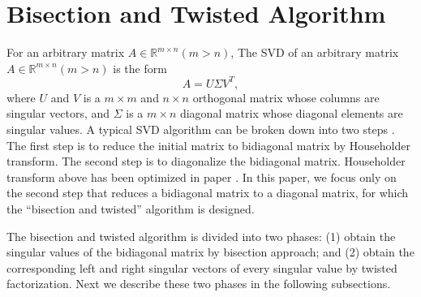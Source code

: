 \section{Bisection and Twisted Algorithm} \label{sec:algorithm}
For an arbitrary matrix $A\in \mathbb{R}^{m \times n} (m>n)$,
The SVD of an arbitrary matrix $A\in \mathbb{R}^{m \times n} (m>n)$ is the form 
\[A = U \Sigma V^T,\] where $U$ and $V$ is a $m \times m$ and $n \times n$ orthogonal matrix whose columns are singular vectors, and $\Sigma$ is a $m\times n$ diagonal matrix whose diagonal elements are singular values.
A typical SVD algorithm can be broken down into two steps \cite{65SIAM}.
The first step is to reduce the initial matrix to bidiagonal matrix by Householder transform.
The second step is to diagonalize the bidiagonal matrix.
Householder transform above has been optimized in paper \cite{LiuHouseholder}.
In this paper, we focus only on the second step that reduces a bidiagonal matrix to a diagonal matrix, for which the ``bisection and twisted'' algorithm is designed.
 
The bisection and twisted algorithm is divided into two phases:
(1) obtain the singular values of the bidiagonal matrix by bisection approach; and
(2) obtain the corresponding left and right singular vectors of every singular value by twisted factorization.
Next we describe these two phases in the following subsections.

\vspace{-0.1in}
